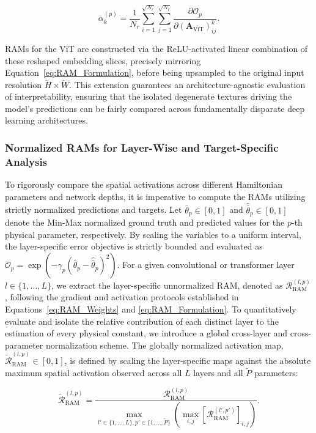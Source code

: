 \documentclass[a4paper,fleqn]{cas-sc}
\begin{document}
\begin{equation}\label{eq:ViT_Weights}
\alpha_k^{(p)} = \frac{1}{N_r} \sum_{i=1}^{\sqrt{N_r}} \sum_{j=1}^{\sqrt{N_r}} \frac{\partial \mathcal{O}_p}{\partial (\mathbf{A}_{\text{ViT}})_{ij}^k}.
\end{equation}

RAMs for the ViT are constructed via the ReLU-activated linear combination of these reshaped embedding slices, precisely mirroring Equation~\ref{eq:RAM_Formulation}, before being upsampled to the original input resolution $\breve{H} \times \breve{W}$. This extension guarantees an architecture-agnostic evaluation of interpretability, ensuring that the isolated degenerate textures driving the model's predictions can be fairly compared across fundamentally disparate deep learning architectures.

\subsubsection{Normalized RAMs for Layer-Wise and Target-Specific Analysis}\label{sec:Nor_RAMs}

To rigorously compare the spatial activations across different Hamiltonian parameters and network depths, it is imperative to compute the RAMs utilizing strictly normalized predictions and targets. Let $\bar{\theta}_p \in [0,1]$ and $\hat{\bar{\theta}}_p \in [0,1]$ denote the Min-Max normalized ground truth and predicted values for the $p$-th physical parameter, respectively. By scaling the variables to a uniform interval, the layer-specific error objective is strictly bounded and evaluated as $\mathcal{O}_p = \exp(-\gamma_p (\bar{\theta}_p - \hat{\bar{\theta}}_p)^2)$. For a given convolutional or transformer layer $l \in \{1, \dots, L\}$, we extract the layer-specific unnormalized RAM, denoted as $\mathcal{R}_{\text{RAM}}^{(l,p)}$, following the gradient and activation protocols established in Equations~\ref{eq:RAM_Weights} and \ref{eq:RAM_Formulation}. To quantitatively evaluate and isolate the relative contribution of each distinct layer to the estimation of every physical constant, we introduce a global cross-layer and cross-parameter normalization scheme. The globally normalized activation map, $\tilde{\mathcal{R}}_{\text{RAM}}^{(l,p)}\in[0,1]$, is defined by scaling the layer-specific maps against the absolute maximum spatial activation observed across all $L$ layers and all $\breve{P}$ parameters:

\begin{equation}\label{eq:RAM_Global_Norm}
\tilde{\mathcal{R}}_{\text{RAM}}^{(l,p)} = \frac{\mathcal{R}_{\text{RAM}}^{(l,p)}}{\max\limits_{l' \in \{1,\dots,L\}, p' \in \{1,\dots,\breve{P}\}} \left( \max\limits_{i,j} \left[ \mathcal{R}_{\text{RAM}}^{(l',p')}\right]_{i,j} \right)}.
\end{equation}
\end{document}
